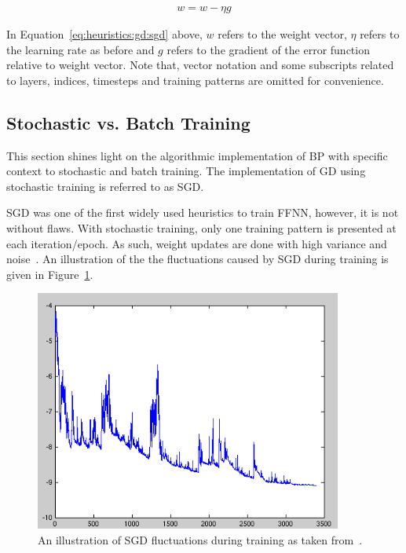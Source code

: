 \begin{equation}
      \label{eq:heuristics:gd:sgd}
      \begin{split}
            w = w - \eta g
      \end{split}
\end{equation}

\noindent
In Equation~\eqref{eq:heuristics:gd:sgd} above, $w$ refers to the weight vector, $\eta$ refers to the learning rate as before and $g$ refers to the gradient of the error function relative to weight vector. Note that, vector notation and some subscripts related to layers, indices, timesteps and training patterns are omitted for convenience.

\subsection{Stochastic vs. Batch Training}\label{sec:heuristics:gd:sgd}

This section shines light on the algorithmic implementation of \acs{BP} with specific context to stochastic and batch training. The implementation of \acs{GD} using stochastic training is referred to as \acf{SGD}.

\acs{SGD} was one of the first widely used heuristics to train \acs{FFNN}, however, it is not without flaws. With stochastic training, only one training pattern is presented at each iteration/epoch. As such, weight updates are done with high variance and noise~\cite{ref:ruder:2016}. An illustration of the the fluctuations caused by \acs{SGD} during training is given in Figure~\ref{fig:heuristics:gd:sgd}.

\begin{figure}[htbp]
      \centering
      \includegraphics[width=0.9\textwidth]{images/sgd.png}
      \caption{An illustration of \acf{SGD} fluctuations during training as taken from~\cite{ref:sgd:2006}.}
      \label{fig:heuristics:gd:sgd}
\end{figure}

